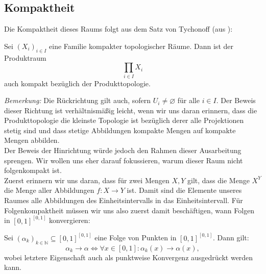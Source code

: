 \documentclass[11pt]{scrartcl}
\begin{document}
\subsection{Kompaktheit}
\noindent Die Kompaktheit dieses Raums folgt aus dem Satz von Tychonoff (aus \cite{Top}):
\begin{theorem}\label{tychonoff}
	Sei $(X_i)_{i\in I}$ eine Familie kompakter topologischer Räume. Dann ist der Produktraum 
	$$\prod_{i\in I} X_i$$ auch kompakt bezüglich der Produkttopologie.
\end{theorem}
\textit{Bemerkung:} Die Rückrichtung gilt auch, sofern $U_i\neq \varnothing$ für alle $i\in I$. Der Beweis dieser Richtung ist verhältnismäßig leicht, wenn
wir uns daran erinnern, dass die Produkttopologie die kleinste Topologie ist bezüglich derer alle Projektionen
stetig sind und dass stetige Abbildungen kompakte Mengen auf kompakte Mengen abbilden.\\
Der Beweis der Hinrichtung würde jedoch den Rahmen dieser Ausarbeitung sprengen. Wir wollen uns eher darauf fokussieren,
warum dieser Raum nicht folgenkompakt ist.\\
Zuerst erinnern wir uns daran, dass für zwei Mengen $X,Y$ gilt, dass die Menge $X^Y$ die Menge aller Abbildungen $f:X\rightarrow Y$
ist. Damit sind die Elemente unseres Raumes alle Abbildungen des Einheitsintervalls in das Einheitsintervall. Für Folgenkompaktheit
müssen wir uns also zuerst damit beschäftigen, wann Folgen in $[0,1]^{[0,1]}$ konvergieren:
\begin{theorem}\label{convInProdS}
	Sei $(\alpha_k)_{k\in\mathbb N} \subseteq [0,1]^{[0,1]}$ eine Folge von Punkten in $[0,1]^{[0,1]}$. Dann gilt:
	$$\alpha_k \rightarrow \alpha \iff \forall x\in[0,1]: \alpha_k(x)\rightarrow \alpha(x),$$
	wobei letztere Eigenschaft auch als punktweise Konvergenz ausgedrückt werden kann.
\end{theorem}
\end{document}
